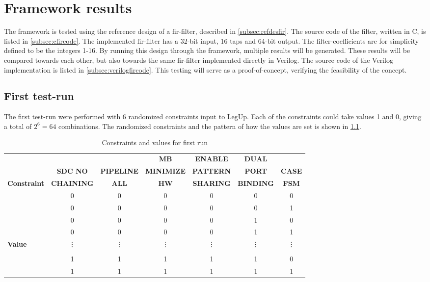 \chapter{\label{chp:frameworkresults}Framework results}
The framework is tested using the reference design of a \gls{fir}-filter, described in \cref{subsec:refdesfir}. The source code of the filter, written in C, is listed in \cref{subsec:cfircode}. The implemented \gls{fir}-filter has a 32-bit input, 16 taps and 64-bit output. The filter-coefficients are for simplicity defined to be the integers 1-16. By running this design through the framework, multiple results will be generated. These results will be compared towards each other, but also towards the same \gls{fir}-filter implemented directly in Verilog. The source code of the Verilog implementation is listed in \cref{subsec:verilogfircode}. This testing will serve as a proof-of-concept, verifying the feasibility of the concept.

\section{\label{sec:firstrun}First test-run}
The first test-run were performed with 6 randomized constraints input to LegUp. Each of the constraints could take values 1 and 0, giving a total of $2^6=64$ combinations. The randomized constraints and the pattern of how the values are set is shown in \cref{tab:randomconstraint}.

\begin{table}
\tiny
    \begin{center}
    \begin{tabular}{l|cccccc}
     & & & \textbf{MB} & \textbf{ENABLE} & \textbf{DUAL} & \\
          &
          \textbf{SDC NO} & 
          \textbf{PIPELINE} & 
          \textbf{MINIMIZE} & 
          \textbf{PATTERN} & 
          \textbf{PORT} &
          \textbf{CASE} \\
        \textbf{Constraint}
           & \textbf{CHAINING}
           & \textbf{ALL}
           & \textbf{HW}
           & \textbf{SHARING}
           & \textbf{BINDING}
           & \textbf{FSM}
    \\ \midrule
    & 0 & 0 & 0 & 0 & 0 & 0 \\
    & 0 & 0 & 0 & 0 & 0 & 1 \\
    & 0 & 0 & 0 & 0 & 1 & 0 \\
    & 0 & 0 & 0 & 0 & 1 & 1 \\
    \textbf{Value} & \vdots & \vdots & \vdots & \vdots & \vdots & \vdots \\
    & &  &  &  &  &  \\
    & 1 & 1 & 1 & 1 & 1 & 0 \\
    & 1 & 1 & 1 & 1 & 1 & 1
    \\ \bottomrule
    \end{tabular}
    \caption{\label{tab:randomconstraint}Constraints and values for first run}
    \end{center}
\end{table}

